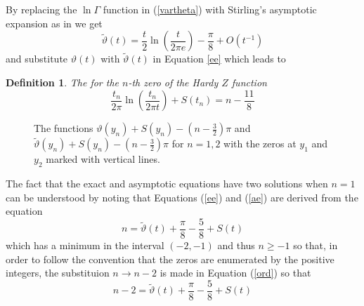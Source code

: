 \documentclass{article}
\newcommand{\tmverbatim}[1]{{\ttfamily{#1}}}
\newtheorem{definition}{Definition}
\begin{document}
By replacing the $\ln \Gamma$ function in (\ref{vartheta}) with Stirling's
asymptotic expansion as in {\cite[Equation 13]{z0t}} we get
\begin{equation}
  \tilde{\vartheta} (t) = \frac{t}{2} \ln \left( \frac{t}{2 \pi e} \right) -
  \frac{\pi}{8} + O (t^{- 1})
\end{equation}
and substitute $\vartheta (t)$ with $\tilde{\vartheta} (t)$ in Equation
\ref{ee} which leads to

\begin{definition}
  The \tmverbatim{asymptotic equation} for the $n$-th zero of the Hardy $Z$
  function
  \begin{equation}
    \frac{t_n}{2 \pi} \ln \left( \frac{t_n}{2 \pi t} \right) + S (t_n) = n -
    \frac{11}{8} \label{ae}
  \end{equation}
  {\cite[Equation 20]{z0t}}
\end{definition}

\begin{figure}[h]
  \caption{The functions $\vartheta (y_n) + S (y_n) - \left( n - \frac{3}{2}
  \right) \pi$ and $\tilde{\vartheta} (y_n) + S (y_n) - \left( n - \frac{3}{2}
  \right) \pi$ for $n = 1, 2$ with the zeros at $y_1$ and $y_2$ marked with
  vertical lines. }
\end{figure}

\begin{remark}
  The fact that the exact and asymptotic equations have two solutions when $n
  = 1$ can be understood by noting that Equations (\ref{ee}) and (\ref{ae})
  are derived from the equation
  \begin{equation}
    n = \tilde{\vartheta} (t) + \frac{\pi}{8} - \frac{5}{8} + S (t_{})
    \label{ord}
  \end{equation}
  which has a minimum in the interval $(- 2, - 1)$ and thus $n \geqslant - 1$
  so that, in order to follow the convention that the zeros are enumerated by
  the positive integers, the substituion $n \rightarrow n - 2$ is made in
  Equation (\ref{ord}) so that
  \begin{equation}
    n - 2 = \tilde{\vartheta} (t) + \frac{\pi}{8} - \frac{5}{8} + S (t_{})
  \end{equation}
  {\cite[Equation 12]{z0t}}
\end{remark}
\end{document}
